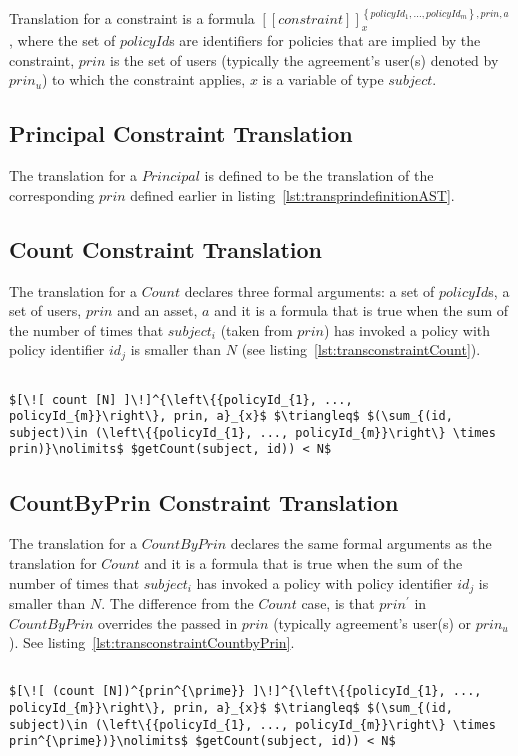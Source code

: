 Translation for a constraint is a formula $[\![constraint]\!]^{\left\{ {policyId_{1}, ..., policyId_{m}}\right\}, prin, a}_{x}$, where the set of $policyId$s are identifiers for policies that are implied by the constraint, $prin$ is the set of users (typically the agreement's user(s) denoted by $prin_{u}$) to which the constraint applies, $x$ is a variable of type $subject$. 

\subsection{Principal Constraint Translation}
The translation for a $Principal$ is defined to be the translation of the corresponding $prin$ defined earlier in listing~\ref{lst:transprindefinitionAST}.   


\subsection{Count Constraint Translation}
The translation for a $Count$ declares three formal arguments: a set of $policyId$s, a set of users, $prin$ and an asset, $a$ and it is a formula that is true when the sum of the number of times that $subject_{i}$ (taken from $prin$) has invoked a policy with policy identifier $id_{j}$ is smaller than $N$ (see listing~\ref{lst:transconstraintCount}). 

\lstset{mathescape, language=AST}  
\begin{lstlisting}[frame=single, caption={Constraint Translation {$\colon$} Count},label={lst:transconstraintCount}]

$[\![ count [N] ]\!]^{\left\{{policyId_{1}, ..., policyId_{m}}\right\}, prin, a}_{x}$ $\triangleq$ $(\sum_{(id, subject)\in (\left\{{policyId_{1}, ..., policyId_{m}}\right\} \times prin)}\nolimits$ $getCount(subject, id)) < N$ 
\end{lstlisting}


\subsection{CountByPrin Constraint Translation}
The translation for a $CountByPrin$ declares the same formal arguments as the translation for $Count$ and it is a formula that is true when the sum of the number of times that $subject_{i}$ has invoked a policy with policy identifier $id_{j}$ is smaller than $N$. The difference from the $Count$ case, is that $prin^{\prime}$ in $CountByPrin$ overrides the passed in $prin$ (typically agreement's user(s) or $prin_{u}$). See listing~\ref{lst:transconstraintCountbyPrin}.


\lstset{mathescape, language=AST}  
\begin{lstlisting}[frame=single, caption={Constraint Translation {$\colon$} Count by Principal},label={lst:transconstraintCountbyPrin}]

$[\![ (count [N])^{prin^{\prime}} ]\!]^{\left\{{policyId_{1}, ..., policyId_{m}}\right\}, prin, a}_{x}$ $\triangleq$ $(\sum_{(id, subject)\in (\left\{{policyId_{1}, ..., policyId_{m}}\right\} \times prin^{\prime})}\nolimits$ $getCount(subject, id)) < N$ 
\end{lstlisting}


